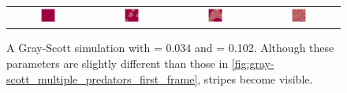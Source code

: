 \begin{figure}[h]
\centering
\mySfFamily
\begin{tabular}{c c c c}
\includegraphics[width = 0.19\textwidth]{../images/f038_k102_multi_Moment_1.jpg} & \includegraphics[width = 0.19\textwidth]{../images/f038_k102_multi_Moment_2.jpg} & \includegraphics[width = 0.19\textwidth]{../images/f038_k102_multi_Moment_3.jpg} & \includegraphics[width = 0.19\textwidth]{../images/f038_k102_multi_Moment_4.jpg}
\end{tabular}
\caption{A Gray-Scott simulation with  = 0.034 and  = 0.102. Although these parameters are slightly different than those in \autoref{fig:gray-scott_multiple_predators_first_frame}, stripes become visible.}
\label{fig:gray-scott_f38_k102_first_frame}
\end{figure}

